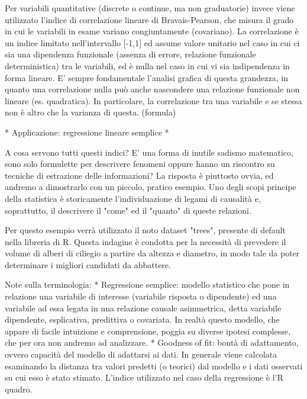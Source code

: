 \documentclass{book}
\begin{document}
Per variabili quantitative (discrete o continue, ma non graduatorie) invece viene utilizzato l'indice di correlazione lineare di Bravais-Pearson, che misura il grado in cui le variabili in esame variano congiuntamente (covariano).
La correlazione \`{e} un indice limitato nell'intervallo [-1,1] ed assume valore unitario nel caso in cui ci sia una dipendenza funzionale (assenza di errore, relazione funzionale deterministica) tra le variabili, ed \`{e} nulla nel caso in cui vi sia indipendenza in forma lineare. E' sempre fondamentale l'analisi grafica di questa grandezza, in quanto una correlazione nulla può anche nascondere una relazione funzionale non lineare (es. quadratica). In particolare, la correlazione tra una variabile e se stessa non \`{e} altro che la varianza di questa.
(formula)

	* Applicazione: regressione lineare semplice *

A cosa servono tutti questi indici? E' una forma di inutile sadismo matematico, sono solo formulette per descrivere fenomeni oppure hanno un riscontro su tecniche di estrazione delle informazioni? La risposta \`{e} piuttosto ovvia, ed andremo a dimostrarlo con un piccolo, pratico esempio.
Uno degli scopi principe della statistica \`{e} storicamente l'individuazione di legami di causalit\`{a} e, soprattutto, il descrivere il "come" ed il "quanto" di queste relazioni.

Per questo esempio verr\`{a} utilizzato il noto dataset "trees", presente di default nella libreria di R. Questa indagine \`{e} condotta per la necessit\`{a} di prevedere il volume di alberi di ciliegio a partire da altezza e diametro, in modo tale da poter determinare i migliori candidati da abbattere.

Note sulla terminologia:
* Regressione semplice: modello statistico che pone in relazione una variabile di interesse (variabile risposta o dipendente) ed una variabile ad essa legata in una relazione causale asimmetrica, detta variabile dipendente, esplicativa, predittiva o covariata. In realt\`{a} questo modello, che appare di facile intuizione e comprensione, poggia su diverse ipotesi complesse, che per ora non andremo ad analizzare.
* Goodness of fit: bont\`{a} di adattamento, ovvero capacit\`{a} del modello di adattarsi ai dati. In generale viene calcolata esaminando la distanza tra valori predetti (o teorici) dal modello e i dati osservati su cui esso \`{e} stato stimato. L'indice utilizzato nel caso della regressione \`{e} l'R quadro.
\end{document}
